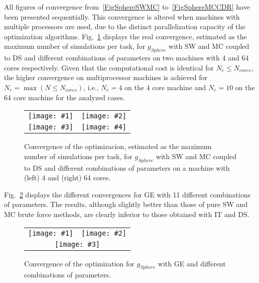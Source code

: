 \documentclass[review,authoryear]{elsarticle}
\newcommand{\FIGIII}[5]
{
	\begin{figure}[ht!]
		\centering
		\begin{tabular}{cc}
			\texttt{[image: \#1]} & \texttt{[image: \#2]} \\
			\multicolumn{2}{c}{\texttt{[image: \#3]}}
		\end{tabular}
		\caption{#4.\label{#5}}
	\end{figure}
}
\newcommand{\FIGIV}[6]
{
	\begin{figure}[ht!]
		\centering
		\begin{tabular}{cc}
			\texttt{[image: \#1]} & \texttt{[image: \#2]} \\
			\texttt{[image: \#3]} & \texttt{[image: \#4]}
		\end{tabular}
		\caption{#5.\label{#6}}
	\end{figure}
}
\newcommand{\PA}[1]{\left(#1\right)}
\begin{document}
All figures of convergence from~\ref{FigSphereSWMC} to~\ref{FigSphereMCCDR}
have been presented sequentially. This convergence is altered when machines with 
multiple processors are used, due to the distinct parallelization capacity of the 
optimization algorithms. Fig.~\ref{FigSphereSWMCDS} displays the real convergence,
estimated as the maximum number of simulations per task, for $g_{Sphere}$ with SW 
and MC coupled to DS and different combinations of parameters on two machines with 4 
and 64 cores respectively. Given that the computational cost is identical for 
$N_e\leq N_{cores}$, the higher convergence on multiprocessor machines is achieved
for $N_e=\max\PA{N\leq N_{cores}}$, i.e., $N_e=4$ on the 4 core machine and $N_e=10$
on the 64 core machine for the analyzed cases.
\FIGIV{sphere-task-1-4.eps}{sphere-task-1-64.eps}
{sphere-task-2-4.eps}{sphere-task-2-64.eps}
{Convergence of the optimizacion, estimated as the maximum number of simulations
per task, for $g_{Sphere}$ with SW and MC coupled to DS and different
combinations of parameters on a machine with (left) 4 and (right) 64 cores}
{FigSphereSWMCDS}

Fig.~\ref{FigSphereGE} displays the different convergences for GE with 11
different combinations of parameters. The results, although slightly better than
those of pure SW and MC brute force methods, are clearly inferior to those
obtained with IT and DS. 
\FIGIII{sphere-evolution-ge-1-4.eps}{sphere-evolution-ge-5-8.eps}
{sphere-evolution-ge-9-11.eps}{Convergence of the optimization for $g_{Sphere}$
with GE and different combinations of parameters}{FigSphereGE}
\end{document}
